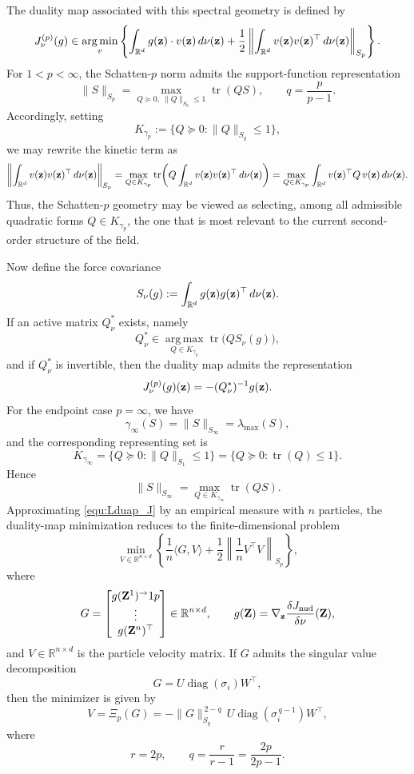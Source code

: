 \documentclass{article}
\theoremstyle{definition}
\begin{document}
The duality map associated with this spectral geometry is defined by
\begin{equation}\label{equ:Lduap_J}
    \begin{aligned}
  J_\nu^{(p)}(g)
\in
\operatorname*{arg\,min}_{v}
\left\{
\int_{\mathbb R^d} g(\mathbf{z})\cdot v(\mathbf{z})\,d\nu(\mathbf{z})
+
\frac12
\left\|
\int_{\mathbb R^d} v(\mathbf{z})v(\mathbf{z})^\top\,d\nu(\mathbf{z})
\right\|_{S_p}
\right\}.  
\end{aligned}
\end{equation}
For $1<p<\infty$, the Schatten-$p$ norm admits the support-function representation
\[
\|S\|_{S_p}
=
\max_{Q\succeq 0,\ \|Q\|_{S_q}\le 1}\operatorname{tr}(QS),
\qquad q=\frac{p}{p-1}.
\]
Accordingly, setting
\[
K_{\gamma_p}
:=
\{Q\succeq 0:\|Q\|_{S_q}\le 1\},
\]
we may rewrite the kinetic term as
\[
\left\|
\int_{\mathbb R^d} v(\mathbf{z})v(\mathbf{z})^\top\,d\nu(\mathbf{z})
\right\|_{S_p}
=
\max_{Q\in K_{\gamma_p}}
\operatorname{tr}\!\left(
Q\int_{\mathbb R^d} v(\mathbf{z})v(\mathbf{z})^\top\,d\nu(\mathbf{z})
\right)
=
\max_{Q\in K_{\gamma_p}}
\int_{\mathbb R^d} v(\mathbf{z})^\top Q\,v(\mathbf{z})\,d\nu(\mathbf{z}).
\]
Thus, the Schatten-$p$ geometry may be viewed as selecting, among all admissible quadratic forms $Q\in K_{\gamma_p}$, the one that is most relevant to the current second-order structure of the field.

Now define the force covariance
\[
S_\nu(g)
:=
\int_{\mathbb R^d} g(\mathbf{z})g(\mathbf{z})^\top\,d\nu(\mathbf{z}).
\]
If an active matrix $Q_\nu^*$ exists, namely
\[
Q_\nu^*
\in
\operatorname*{arg\,max}_{Q\in K_{\gamma_p}}
\operatorname{tr}\!\bigl(QS_\nu(g)\bigr),
\]
and if $Q_\nu^*$ is invertible, then the duality map admits the representation
\[
J_\nu^{(p)}(g)(\mathbf{z})=-(Q_\nu^*)^{-1}g(\mathbf{z}).
\]
For the endpoint case $p=\infty$, we have
\[
\gamma_\infty(S)=\|S\|_{S_\infty}=\lambda_{\max}(S),
\]
and the corresponding representing set is
\[
K_{\gamma_\infty}
=
\{Q\succeq 0:\|Q\|_{S_1}\le 1\}
=
\{Q\succeq 0:\operatorname{tr}(Q)\le 1\}.
\]
Hence
\[
\|S\|_{S_\infty}
=
\max_{Q\in K_{\gamma_\infty}}\operatorname{tr}(QS).
\]
Approximating \eqref{equ:Lduap_J} by an empirical measure with $n$ particles, the duality-map minimization reduces to the finite-dimensional problem
\[
\min_{V\in\mathbb R^{n\times d}}
\left\{
\frac1n \langle G,V\rangle
+
\frac12
\left\|
\frac1n V^\top V
\right\|_{S_p}
\right\},
\]
where
\[
G=
\begin{bmatrix}
g(\mathbf{Z}^1)^\to1p\\
\vdots\\
g(\mathbf{Z}^n)^\top
\end{bmatrix}\in\mathbb R^{n\times d},
\qquad
g(\mathbf{Z})=\nabla_{\mathbf{z}}\frac{\delta J_{\mathrm{nud}}}{\delta \nu}(\mathbf{Z}),
\]
and $V\in\mathbb R^{n\times d}$ is the particle velocity matrix.
If $G$ admits the singular value decomposition
\[
G=U\operatorname{diag}(\sigma_i)W^\top,
\]
then the minimizer is given by
\[
V=\Xi_p(G)
=
-\|G\|_{S_q}^{\,2-q}\,
U\operatorname{diag}(\sigma_i^{\,q-1})W^\top,
\]
where
\[
r=2p,\qquad q=\frac{r}{r-1}=\frac{2p}{2p-1}.
\]
\end{document}
